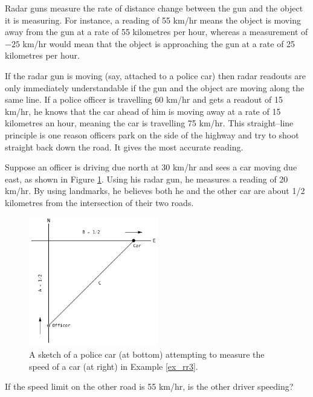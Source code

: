 \begin{example}\label{ex_rr3}
Radar guns measure the rate of distance change between the gun and the object it is measuring. For instance, a reading of 55 km/hr means the object is moving away from the gun at a rate of 55 kilometres per hour, whereas a measurement of $-25$ km/hr would mean that the object is approaching the gun at a rate of 25 kilometres per hour.

If the radar gun is moving (say, attached to a police car) then radar readouts are only immediately understandable if the gun and the object are moving along the same line. If a police officer is travelling 60 km/hr and gets a readout of 15 km/hr, he knows that the car ahead of him is moving away at a rate of 15 kilometres an hour, meaning the car is travelling 75 km/hr. This straight--line principle is one reason officers park on the side of the highway and try to shoot straight back down the road. It gives the most accurate reading.

Suppose an officer is driving due north at 30 km/hr and sees a car moving due east, as shown in Figure \ref{fig_diff_16}. Using his radar gun, he measures a reading of 20 km/hr. By using landmarks, he believes both he and the other car are about 1/2 kilometres from the intersection of their two roads. 

\begin{figure}[H]
	\begin{center}
			\includegraphics[width=0.5\textwidth]{fig_diff_16}
	\caption{A sketch of a police car (at bottom) attempting to measure the speed of a car (at right) in Example \ref{ex_rr3}.}
	\label{fig_diff_16}
	\end{center}
\end{figure}


If the speed limit on the other road is 55 km/hr, is the other driver speeding?


\end{example}
